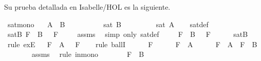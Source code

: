 \begin{isabellebody}
\begin{isamarkuptext}
  Su prueba detallada en Isabelle/HOL es la siguiente.%
\end{isamarkuptext}\isamarkuptrue%
\isamarkupfalse%
\ sat{\isacharunderscore}mono{\isacharcolon}\isanewline
\ \ \ {\isachardoublequoteopen}A\ {\isasymsubseteq}\ B{\isachardoublequoteclose}\isanewline
\ \ \ \ \ \ \ \ \ \ {\isachardoublequoteopen}sat\ B{\isachardoublequoteclose}\isanewline
\ \ \ \ \ \ \ \ \ {\isachardoublequoteopen}sat\ A{\isachardoublequoteclose}\isanewline
%
\isadelimproof
\ \ %
\endisadelimproof
%
\isatagproof
{}\isamarkupfalse%
\ sat{\isacharunderscore}def\isanewline
{}\isamarkupfalse%
\ {\isacharminus}\isanewline
\ \isamarkupfalse%
\ satB{\isacharcolon}{\isachardoublequoteopen}{\isasymexists}{\isasymA}{\isachardot}\ {\isasymforall}F\ {\isasymin}\ B{\isachardot}\ {\isasymA}\ {\isasymTurnstile}\ F{\isachardoublequoteclose}\isanewline
\ \ \ \isamarkupfalse%
\ assms{\isacharparenleft}{}{\isacharparenright}\ \isamarkupfalse%
\ {\isacharparenleft}simp\ only{\isacharcolon}\ sat{\isacharunderscore}def{\isacharparenright}\isanewline
\ \isamarkupfalse%
\ {\isasymA}\ \ {\isachardoublequoteopen}{\isasymforall}F\ {\isasymin}\ B{\isachardot}\ {\isasymA}\ {\isasymTurnstile}\ F{\isachardoublequoteclose}\isanewline
\ \ \ \ \isamarkupfalse%
\ satB\ \isamarkupfalse%
\ {\isacharparenleft}rule\ exE{\isacharparenright}\isanewline
\ \isamarkupfalse%
\ {\isachardoublequoteopen}{\isasymforall}F\ {\isasymin}\ A{\isachardot}\ {\isasymA}\ {\isasymTurnstile}\ F{\isachardoublequoteclose}\isanewline
\ \ \isamarkupfalse%
\ {\isacharparenleft}rule\ ballI{\isacharparenright}\isanewline
\ \ \ \ \isamarkupfalse%
\ F\isanewline
\ \ \ \ \isamarkupfalse%
\ {\isachardoublequoteopen}F\ {\isasymin}\ A{\isachardoublequoteclose}\isanewline
\ \ \ \ \isamarkupfalse%
\ {\isachardoublequoteopen}F\ {\isasymin}\ A\ {\isasymlongrightarrow}\ F\ {\isasymin}\ B{\isachardoublequoteclose}\isanewline
\ \ \ \ \ \ \isamarkupfalse%
\ assms{\isacharparenleft}{}{\isacharparenright}\ \isamarkupfalse%
\ {\isacharparenleft}rule\ in{\isacharunderscore}mono{\isacharparenright}\isanewline
\ \ \ \ \isamarkupfalse%
\ \isamarkupfalse%
\ {\isachardoublequoteopen}F\ {\isasymin}\ B{\isachardoublequoteclose}\isanewline
\ \ \ \ \ \ \isamarkupfalse%

\end{isabellebody}
